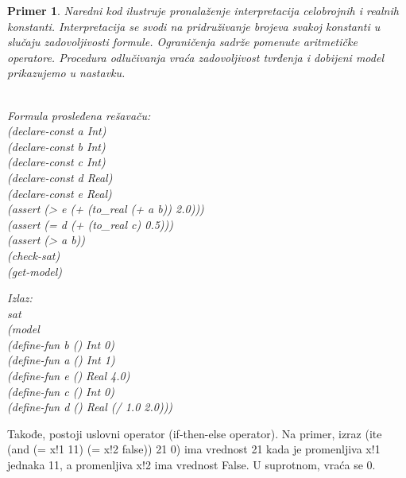 \documentclass[12pt,oneside]{memoir}
\newtheorem{primer}{Primer}
\begin{document}
\begin{primer} Naredni kod ilustruje pronalaženje interpretacija celobrojnih i realnih konstanti. Interpretacija se svodi na pridruživanje brojeva svakoj konstanti u slučaju zadovoljivosti formule. Ograničenja sadrže pomenute aritmetičke operatore.  Procedura odlučivanja vraća zadovoljivost tvrđenja i dobijeni model prikazujemo u nastavku.   \\ \\
\hspace{-0.7cm}
\begin{minipage}[b]{0.4\textwidth}
Formula prosleđena rešavaču:
\\(declare-const a Int)
\\(declare-const b Int)
\\(declare-const c Int)
\\(declare-const d Real)
\\(declare-const e Real)
\\(assert (> e (+ (to\_real (+ a b)) 2.0)))
\\(assert (= d (+ (to\_real c) 0.5)))
\\(assert (> a b))
\\(check-sat)
\\(get-model)
\end{minipage}
\hspace{3.15cm}
\begin{minipage}[t]{0.4\textwidth}
\vspace{-7.2cm}
Izlaz:
\\sat 
\\(model
\\(define-fun b () Int 0) 
\\(define-fun a () Int 1) 
\\(define-fun e () Real 4.0) \\(define-fun c () Int 0) \\(define-fun d () Real (/ 1.0 2.0)))
\end{minipage}


\end{primer}


Takođe, postoji uslovni operator (if-then-else operator). Na primer,
izraz (ite (and (= x!1 11) (= x!2 false)) 21 0) ima vrednost 21 kada je promenljiva x!1 jednaka 11, a promenljiva x!2 ima vrednost False. U suprotnom, vraća se 0.
\end{document}

